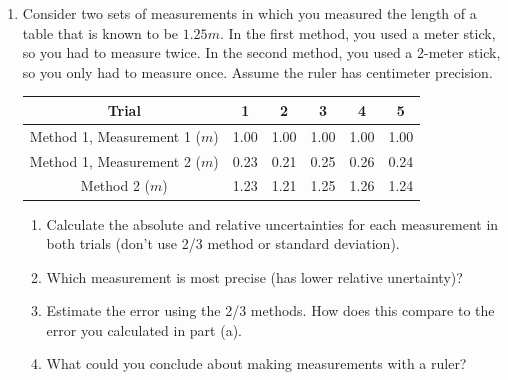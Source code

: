 \begin{enumerate}
  \item Consider two sets of measurements in which you measured the length of a table that is known to be $1.25 m$. In the first method, you used a meter stick, so you had to measure twice. In the second method, you used a 2-meter stick, so you only had to measure once. Assume the ruler has centimeter precision.
  \begin{center}
    \begin{tabular}{ |c | c | c | c | c | c |}
      \hline
      Trial &1&2&3&4&5 \\ \hline
      Method 1, Measurement 1 ($m$) & 1.00 & 1.00 & 1.00 &1.00 &1.00 \\
      \hline
      Method 1, Measurement 2  ($m$)& 0.23 &0.21&0.25&0.26&0.24 \\
      \hline
      Method 2 ($m$)& 1.23&1.21&1.25&1.26&1.24 \\
      \hline
    \end{tabular}
  \end{center}
  \begin{enumerate}
    \item Calculate the absolute and relative uncertainties for each measurement in both trials (don't use 2/3 method or standard deviation).
    \item Which measurement is most precise (has lower relative unertainty)?
    \item Estimate the error using the 2/3 methods. How does this compare to the error you calculated in part (a).
    \item What could you conclude about making measurements with a ruler?
  \end{enumerate}


\end{enumerate}
